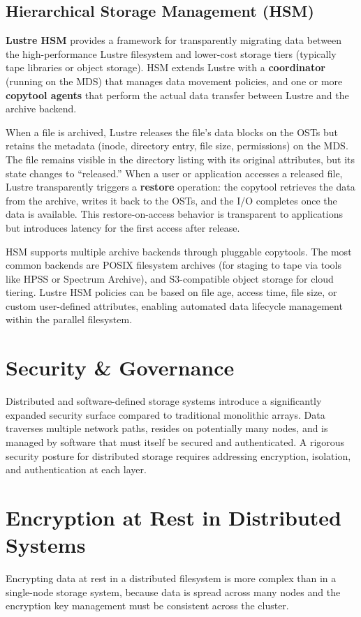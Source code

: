 \subsection{Hierarchical Storage Management (HSM)}

\textbf{Lustre HSM} provides a framework for transparently migrating data between the high-performance Lustre filesystem and lower-cost storage tiers (typically tape libraries or object storage). HSM extends Lustre with a \textbf{coordinator} (running on the MDS) that manages data movement policies, and one or more \textbf{copytool agents} that perform the actual data transfer between Lustre and the archive backend.

When a file is archived, Lustre releases the file's data blocks on the OSTs but retains the metadata (inode, directory entry, file size, permissions) on the MDS. The file remains visible in the directory listing with its original attributes, but its state changes to ``released.'' When a user or application accesses a released file, Lustre transparently triggers a \textbf{restore} operation: the copytool retrieves the data from the archive, writes it back to the OSTs, and the I/O completes once the data is available. This restore-on-access behavior is transparent to applications but introduces latency for the first access after release.

HSM supports multiple archive backends through pluggable copytools. The most common backends are POSIX filesystem archives (for staging to tape via tools like HPSS or Spectrum Archive), and S3-compatible object storage for cloud tiering. Lustre HSM policies can be based on file age, access time, file size, or custom user-defined attributes, enabling automated data lifecycle management within the parallel filesystem.


\section{Security \& Governance}
Distributed and software-defined storage systems introduce a significantly expanded security surface compared to traditional monolithic arrays. Data traverses multiple network paths, resides on potentially many nodes, and is managed by software that must itself be secured and authenticated. A rigorous security posture for distributed storage requires addressing encryption, isolation, and authentication at each layer.

\section{Encryption at Rest in Distributed Systems}
Encrypting data at rest in a distributed filesystem is more complex than in a single-node storage system, because data is spread across many nodes and the encryption key management must be consistent across the cluster.

